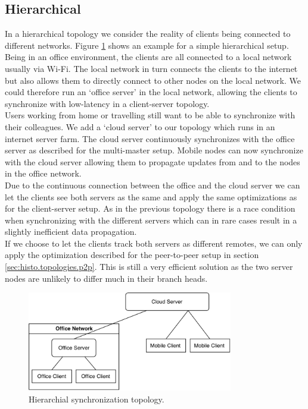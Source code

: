 \subsection{Hierarchical}
In a hierarchical topology we consider the reality of clients being connected to different networks.
Figure \ref{fig:histo.topologies.hierarchical} shows an example for a simple hierarchical setup.
Being in an office environment, the clients are all connected to a local network usually via Wi-Fi.
The local network in turn connects the clients to the internet but also allows them to directly connect to other nodes on the local network.
We could therefore run an `office server' in the local network, allowing the clients to synchronize with low-latency in a client-server topology.\\
Users working from home or travelling still want to be able to synchronize with their colleagues.
We add a `cloud server' to our topology which runs in an internet server farm.
The cloud server continuously synchronizes with the office server as described for the multi-master setup.
Mobile nodes can now synchronize with the cloud server allowing them to propagate updates from and to the nodes in the office network.\\
Due to the continuous connection between the office and the cloud server we can let the clients see both servers as the same and apply the same optimizations as for the client-server setup.
As in the previous topology there is a race condition when synchronizing with the different servers which can in rare cases result in a slightly inefficient data propagation.\\
If we choose to let the clients track both servers as different remotes, we can only apply the optimization described for the peer-to-peer setup in section \ref{sec:histo.topologies.p2p}.
This is still a very efficient solution as the two server nodes are unlikely to differ much in their branch heads.

\begin{figure}[!ht]
  \centering
  \includegraphics[width=0.8\textwidth]{img/hierarchical}
  \caption{Hierarchial synchronization topology.}
  \label{fig:histo.topologies.hierarchical}
\end{figure}
